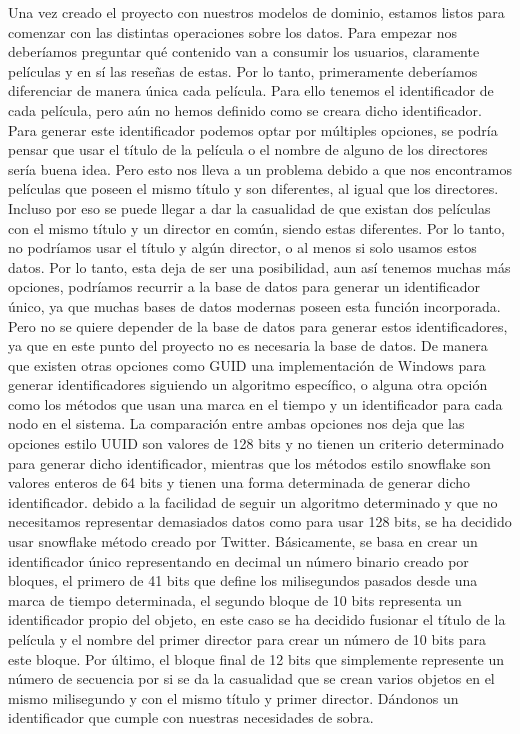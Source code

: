 Una vez creado el proyecto con nuestros modelos de dominio, estamos listos para comenzar con las 
distintas operaciones sobre los datos. Para empezar nos deberíamos preguntar qué contenido van a 
consumir los usuarios, claramente películas y en sí las reseñas de estas. Por lo tanto, primeramente 
deberíamos diferenciar de manera única cada película. Para ello tenemos el identificador de cada 
película, pero aún no hemos definido como se creara dicho identificador. Para generar este 
identificador podemos optar por múltiples opciones, se podría pensar que usar el título de la película 
o el nombre de alguno de los directores sería buena idea. Pero esto nos lleva a un problema debido a 
que nos encontramos películas que poseen el mismo título y son diferentes, al igual que los directores. 
Incluso por eso se puede llegar a dar la casualidad de que existan dos películas con el mismo título y 
un director en común, siendo estas diferentes. Por lo tanto, no podríamos usar el título y algún 
director, o al menos si solo usamos estos datos. Por lo tanto, esta deja de ser una posibilidad, aun 
así tenemos muchas más opciones, podríamos recurrir a la base de datos para generar un identificador 
único, ya que muchas bases de datos modernas poseen esta función incorporada. Pero no se quiere 
depender de la base de datos para generar estos identificadores, ya que en este punto del proyecto no 
es necesaria la base de datos. De manera que existen otras opciones como GUID una implementación de 
Windows para generar identificadores siguiendo un algoritmo específico, o alguna otra opción como los 
métodos que usan una marca en el tiempo y un identificador para cada nodo en el sistema. La comparación 
entre ambas opciones \cite{compSnowUUID} nos deja que las opciones estilo UUID son valores de 128 bits 
y no tienen un criterio determinado para generar dicho identificador, mientras que los métodos estilo 
snowflake son valores enteros de 64 bits y tienen una forma determinada de generar dicho identificador. 
debido a la facilidad de seguir un algoritmo determinado y que no necesitamos representar demasiados 
datos como para usar 128 bits, se ha decidido usar snowflake \cite{snowF} método creado por Twitter. 
Básicamente, se basa en crear un identificador único representando en decimal un número binario creado 
por bloques, el primero de 41 bits que define los milisegundos pasados desde una marca de tiempo 
determinada, el segundo bloque de 10 bits representa un identificador propio del objeto, en este caso 
se ha decidido fusionar el título de la película y el nombre del primer director para crear un número 
de 10 bits para este bloque. Por último, el bloque final de 12 bits que simplemente represente un 
número de secuencia por si se da la casualidad que se crean varios objetos en el mismo milisegundo y 
con el mismo título y primer director. Dándonos un identificador que cumple con nuestras necesidades de 
sobra.

